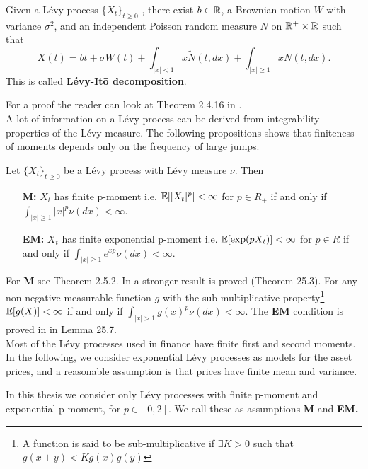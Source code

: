 \begin{Theorem}
 Given a Lévy process $\{X_t\}_{t \ge 0}$ , there exist $b\in \mathbb{R}$, a Brownian motion $W$ with variance $\sigma^2$, and an 
 independent Poisson random measure $N$ on $\mathbb{R}^+ \times \mathbb{R}$ such that
 \begin{equation}\label{Levy_Ito}
  X(t) = bt + \sigma W(t) + \int_{|x|<1} x \tilde{N}(t,dx) + \int_{|x|\geq1} x N(t,dx).
 \end{equation}
 This is called \textbf{Lévy-It\={o} decomposition}.
\end{Theorem}
 For a proof the reader can look at Theorem 2.4.16 in \cite{Applebaum}.\\
A lot of information on a Lévy process can be derived from integrability properties of the Lévy measure. 
The following propositions shows that finiteness of moments depends only on the frequency of large jumps.
\begin{Theorem} \label{assumptionM}
 Let $\{X_t\}_{t \ge 0}$ be a Lévy process with Lévy measure $\nu$. Then
 \begin{enumerate}
  \item[\textbf{M:}] \label{M} $X_t$ has finite p-moment i.e. 
  $\mathbb{E}[|X_t|^p]<\infty$ for $p\in R_+$ if and only if $\int_{|x| \geq 1} |x|^p \nu(dx) <\infty$.
  \item[\textbf{EM:}] \label{EM} $X_t$ has finite exponential p-moment i.e. $\mathbb{E}[\exp(pX_t)]<\infty$ for $p\in R$ if and only if 
  $\int_{|x| \geq 1} e^{xp} \nu(dx) <\infty$.
 \end{enumerate}
\end{Theorem}
 For \textbf{M} see \cite{Applebaum} Theorem 2.5.2. 
 In \cite{Sato} a stronger result is proved (Theorem 25.3). For any non-negative measurable function $g$ with the sub-multiplicative
 property\footnote{A function is said to be sub-multiplicative if $\exists K>0$ such that $g(x+y)<Kg(x)g(y)$ } $\mathbb{E}[g(X)]<\infty$ if and only if $\int_{|x| > 1} g(x)^p \nu(dx) <\infty$.
 The \textbf{EM} condition is proved in \cite{Sato} in Lemma 25.7.\\

Most of the Lévy processes used in finance have finite first and second moments. In the following, we consider exponential
Lévy processes as models for the asset prices, and a reasonable assumption is that prices have finite mean and variance. 

\begin{center}
\begin{riquadro}{12cm}
In this thesis we consider only Lévy processes with finite p-moment and exponential p-moment, for $p\in [0,2]$.
We call these as assumptions \textbf{M} and \textbf{EM.} 
\end{riquadro}
\end{center}

